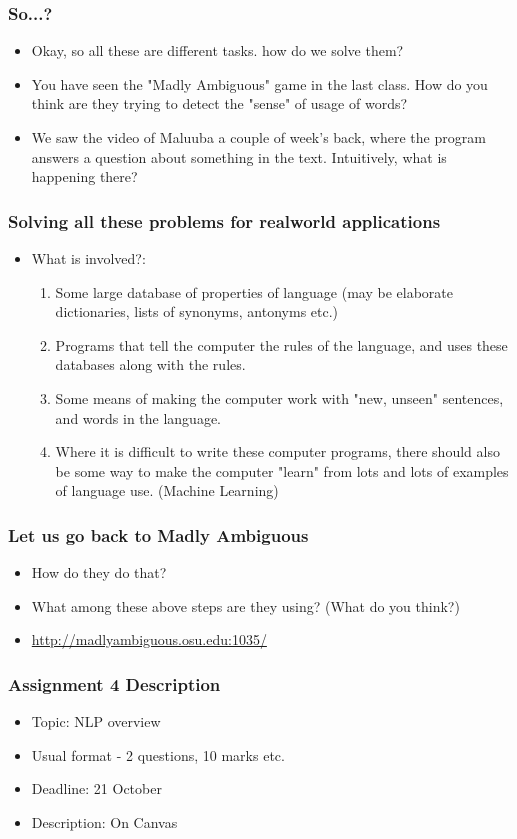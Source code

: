 \documentclass{beamer}
\begin{document}
\begin{frame}
\frametitle{So...?}
\begin{itemize}
\item Okay, so all these are different tasks. how do we solve them? \pause
\item You have seen the "Madly Ambiguous" game in the last class. How do you think are they trying to detect the "sense" of usage of words? \pause
\item We saw the video of Maluuba a couple of week's back, where the program answers a question about something in the text. Intuitively, what is happening there?
\end{itemize}
\end{frame}

\begin{frame}
\frametitle{Solving all these problems for realworld applications}
\begin{itemize}
\item What is involved?:
\begin{enumerate}
\item Some large database of properties of language (may be elaborate dictionaries, lists of synonyms, antonyms etc.) \pause
\item Programs that tell the computer the rules of the language, and uses these databases along with the rules. \pause
\item Some means of making the computer work with "new, unseen" sentences, and words in the language. \pause
\item Where it is difficult to write these computer programs, there should also be some way to make the computer "learn" from lots and lots of examples of language use. (Machine Learning)
\end{enumerate}
\end{itemize}
\end{frame}

\begin{frame}
\frametitle{Let us go back to Madly Ambiguous}
\begin{itemize}
\item How do they do that? 
\item What among these above steps are they using? (What do you think?)
\item \url{http://madlyambiguous.osu.edu:1035/}
\end{itemize}
\end{frame}

\begin{frame}
\frametitle{Assignment 4 Description}
\begin{itemize}
\item Topic: NLP overview
\item Usual format - 2 questions, 10 marks etc. 
\item Deadline: 21 October
\item Description: On Canvas
\end{itemize}
\end{frame}
\end{document}
